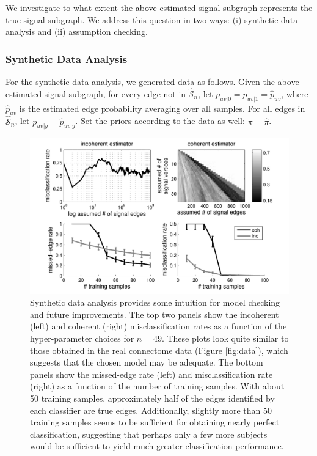 \documentclass[10pt,journal,cspaper,compsoc]{IEEEtran}
\providecommand{\tk}[1]{\textcolor{black}{#1}}
\providecommand{\wh}[1]{\widehat{#1}}
\providecommand{\mhc}[1]{\widehat{\mathcal{#1}}}
\newcommand{\comment}[1]{}
\begin{document}
\comment{Although the signal-subgraph classifier employed above estimated a signal-subgraph, w}We investigate to what extent the \tk{above} estimated signal-subgraph represents the true signal-subgraph.  We address this question in two ways:  (i) synthetic data analysis and (ii) assumption checking.  

\subsubsection{Synthetic Data Analysis} %
\label{ssub:synthetic_data_analysis}

For the synthetic data analysis, we generated data as follows.  Given the above estimated signal-subgraph, for every edge not in $\mhc{S}_n$, let $p_{uv|0}=p_{uv|1}=\wh{p}_{uv}$, where $\wh{p}_{uv}$ is the estimated edge probability averaging over all samples.  For all edges in $\mhc{S}_n$, let $p_{uv|y}=\wh{p}_{uv|y}$.  Set the priors according to the data as well: $\pi=\wh{\pi}$.  

\begin{figure}[tb!]
	\centering
		\includegraphics[width=0.7\linewidth]{../figs/BLSA0317_Count_synthetic_Lhats.pdf}
	\caption{Synthetic data analysis provides some intuition for model checking and future improvements.  The top two panels show the incoherent (left) and coherent (right) misclassification rates as a function of the hyper-parameter choices for $n=49$.  These plots look quite similar to those obtained in the real connectome data (Figure \ref{fig:data}), which suggests that the chosen model may be adequate.  The bottom panels show the missed-edge rate (left) and misclassification rate (right) as a function of the number of training samples.  With about 50 training samples, approximately half of the edges identified by each classifier are true edges.  Additionally, slightly more than 50 training samples seems to be sufficient for obtaining nearly perfect classification, suggesting that perhaps only a few more subjects would be sufficient to yield much greater classification performance.}
	\label{fig:synthetic}
\end{figure}
\end{document}

